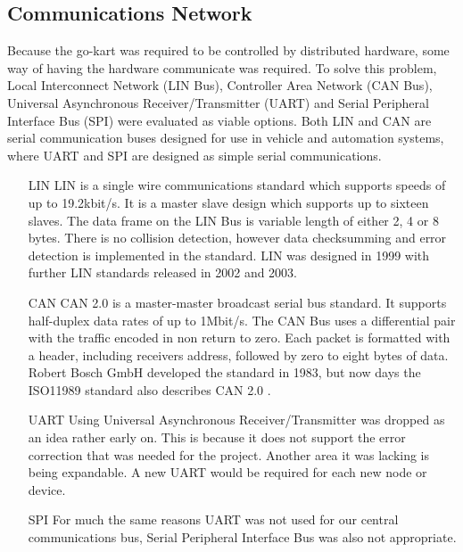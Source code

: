   \subsection{Communications Network}
  Because the go-kart was required to be controlled by distributed hardware,
  some way of having the hardware communicate was required. To solve this
  problem, Local Interconnect Network (LIN Bus), Controller Area Network (CAN
  Bus), Universal Asynchronous Receiver/Transmitter (UART) and Serial
  Peripheral Interface Bus (SPI) were evaluated as viable options. Both LIN and
  CAN are serial communication buses designed for use in vehicle and automation
  systems, where UART and SPI are designed as simple serial communications.
  
  \begin{itemize}
    \item[LIN]{LIN is a single wire communications standard which supports
    speeds of up to 19.2kbit/s\cite{LIN}. It is a master slave design which
    supports up to sixteen slaves. The data frame on the LIN Bus is variable
    length of either 2, 4 or 8 bytes. There is no collision detection, however
    data checksumming and error detection is implemented in the standard.  LIN
    was designed in 1999 with further LIN standards released in 2002 and 2003.}

    \item[CAN]{CAN 2.0 is a master-master broadcast serial bus standard. It
    supports half-duplex data rates of up to 1Mbit/s. The CAN Bus uses a
    differential pair with the traffic encoded in non return to zero. Each
    packet is formatted with a header, including receivers address, followed by
    zero to eight bytes of data. Robert Bosch GmbH \cite{bosch} developed the
    standard in 1983, but now days the ISO11989 standard also describes CAN 2.0
    \cite{boschCAN, ISOCAN}.}

    \item[UART]{Using Universal Asynchronous Receiver/Transmitter was dropped
    as an idea rather early on. This is because it does not support the error
    correction that was needed for the project. Another area it was lacking is
    being expandable. A new UART would be required for each new node or
    device.}

    \item[SPI]{For much the same reasons UART was not used for our central
    communications bus, Serial Peripheral Interface Bus was also not
    appropriate.} 

  \end{itemize}

